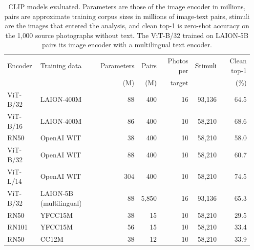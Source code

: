 \begin{table}[tbp]
\centering
\caption{CLIP models evaluated. Parameters are those of the image encoder in millions, pairs are approximate training corpus sizes in millions of image-text pairs, stimuli are the images that entered the analysis, and clean top-1 is zero-shot accuracy on the 1{,}000 source photographs without text. The ViT-B/32 trained on LAION-5B pairs its image encoder with a multilingual text encoder.}
\label{tab:models}
\small
\begin{tabular*}{\textwidth}{@{\extracolsep{\fill}}llrrrrr@{}}
\toprule
Encoder & Training data & Parameters & Pairs & Photos per & Stimuli & Clean top-1 \\
 & & (M) & (M) & target & & (\%) \\
\midrule
ViT-B/32 & LAION-400M & 88 & 400 & 16 & 93{,}136 & 64.5 \\
ViT-B/16 & LAION-400M & 86 & 400 & 10 & 58{,}210 & 68.6 \\
RN50 & OpenAI WIT & 38 & 400 & 10 & 58{,}210 & 58.0 \\
ViT-B/32 & OpenAI WIT & 88 & 400 & 10 & 58{,}210 & 60.7 \\
ViT-L/14 & OpenAI WIT & 304 & 400 & 10 & 58{,}210 & 74.5 \\
ViT-B/32 & LAION-5B (multilingual) & 88 & 5{,}850 & 16 & 93{,}136 & 65.3 \\
RN50 & YFCC15M & 38 & 15 & 10 & 58{,}210 & 29.5 \\
RN101 & YFCC15M & 56 & 15 & 10 & 58{,}210 & 33.4 \\
RN50 & CC12M & 38 & 12 & 10 & 58{,}210 & 33.9 \\
\bottomrule
\end{tabular*}
\end{table}
